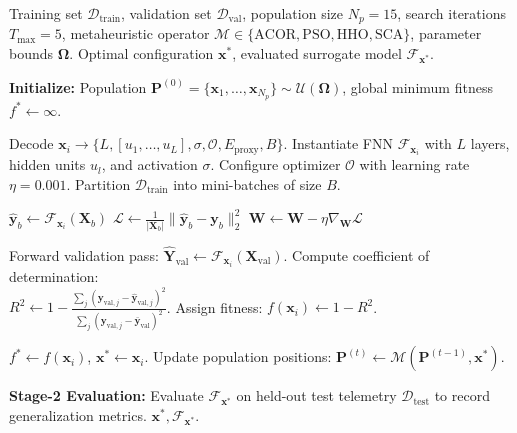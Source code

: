 \documentclass[runningheads]{llncs}
\begin{document}
\begin{algorithm}[t]
	\caption{Proposed Metaheuristic Neural Architecture and Hyperparameter Optimization}
	\label{alg:metaheuristic_optimization}
	\begin{algorithmic}[1]
		\REQUIRE Training set $\mathcal{D}_{\text{train}}$, validation set $\mathcal{D}_{\text{val}}$,
		population size $N_p = 15$, search iterations $T_{\max} = 5$, metaheuristic operator $\mathcal{M}
		\in \{\text{ACOR}, \text{PSO}, \text{HHO}, \text{SCA}\}$, parameter bounds $\mathbf{\Omega}$.
		\ENSURE Optimal configuration $\mathbf{x}^*$, evaluated surrogate model $\mathcal{F}_{\mathbf{x}^*}$.

		\STATE \textbf{Initialize:} Population $\mathbf{P}^{(0)} = \{\mathbf{x}_1, \dots,
		\mathbf{x}_{N_p}\} \sim \mathcal{U}(\mathbf{\Omega})$, global minimum fitness $f^* \leftarrow \infty$.

		\STATE Decode $\mathbf{x}_i \to \{L, [u_1, \dots, u_L], \sigma, \mathcal{O}, E_{\text{proxy}}, B\}$.
		\STATE Instantiate FNN $\mathcal{F}_{\mathbf{x}_i}$ with $L$ layers, hidden units $u_l$, and activation $\sigma$.
		\STATE Configure optimizer $\mathcal{O}$ with learning rate $\eta = 0.001$.
		\STATE Partition $\mathcal{D}_{\text{train}}$ into mini-batches of size $B$.

		\STATE $\hat{\mathbf{y}}_b \leftarrow \mathcal{F}_{\mathbf{x}_i}(\mathbf{X}_b)$
		\STATE $\mathcal{L} \leftarrow \frac{1}{|\mathbf{X}_b|} \|\hat{\mathbf{y}}_b - \mathbf{y}_b\|_2^2$ 
		\STATE $\mathbf{W} \leftarrow \mathbf{W} - \eta \nabla_{\mathbf{W}} \mathcal{L}$
		\ENDFOR
		\ENDFOR

		\STATE Forward validation pass: $\hat{\mathbf{Y}}_{\text{val}} \leftarrow
		\mathcal{F}_{\mathbf{x}_i}(\mathbf{X}_{\text{val}})$.
		\STATE Compute coefficient of determination: \\
		\quad $R^2 \leftarrow 1 - \frac{\sum_{j} (\mathbf{y}_{\text{val}, j} -
		\hat{\mathbf{y}}_{\text{val}, j})^2}{\sum_{j} (\mathbf{y}_{\text{val}, j} - \bar{\mathbf{y}}_{\text{val}})^2}$.
		\STATE Assign fitness: $f(\mathbf{x}_i) \leftarrow 1 - R^2$.

		\STATE $f^* \leftarrow f(\mathbf{x}_i)$, \quad $\mathbf{x}^* \leftarrow \mathbf{x}_i$.
		\ENDIF
		\ENDFOR
		\STATE Update population positions: $\mathbf{P}^{(t)} \leftarrow \mathcal{M}(\mathbf{P}^{(t-1)}, \mathbf{x}^*)$.
		\ENDFOR

		\STATE \textbf{Stage-2 Evaluation:} Evaluate $\mathcal{F}_{\mathbf{x}^*}$ on held-out test
		telemetry $\mathcal{D}_{\text{test}}$ to record generalization metrics.
		\RETURN $\mathbf{x}^*, \mathcal{F}_{\mathbf{x}^*}$.
	\end{algorithmic}
\end{algorithm}
\end{document}
